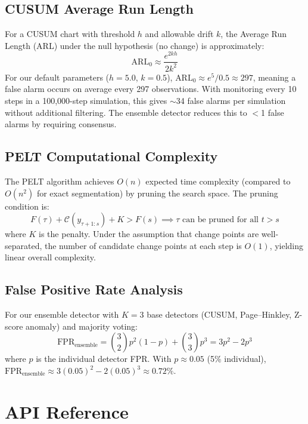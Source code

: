 \documentclass[11pt,a4paper]{article}
\begin{document}
\subsection{CUSUM Average Run Length}

For a CUSUM chart with threshold $h$ and allowable drift $k$, the Average Run Length (ARL) under the null hypothesis (no change) is approximately:
\begin{equation}
    \text{ARL}_0 \approx \frac{e^{2kh}}{2k^2}
\end{equation}
For our default parameters ($h = 5.0$, $k = 0.5$), $\text{ARL}_0 \approx e^{5}/0.5 \approx 297$, meaning a false alarm occurs on average every 297 observations. With monitoring every 10 steps in a 100{,}000-step simulation, this gives ${\sim}$34 false alarms per simulation without additional filtering. The ensemble detector reduces this to $<$1 false alarms by requiring consensus.

\subsection{PELT Computational Complexity}

The PELT algorithm achieves $O(n)$ expected time complexity (compared to $O(n^2)$ for exact segmentation) by pruning the search space. The pruning condition is:
\begin{equation}
    F(\tau) + \mathcal{C}(y_{\tau+1:s}) + K > F(s) \implies \tau \text{ can be pruned for all } t > s
\end{equation}
where $K$ is the penalty. Under the assumption that change points are well-separated, the number of candidate change points at each step is $O(1)$, yielding linear overall complexity.

\subsection{False Positive Rate Analysis}

For our ensemble detector with $K = 3$ base detectors (CUSUM, Page--Hinkley, Z-score anomaly) and majority voting:
\begin{equation}
    \text{FPR}_{\text{ensemble}} = \binom{3}{2} p^2(1-p) + \binom{3}{3} p^3 = 3p^2 - 2p^3
\end{equation}
where $p$ is the individual detector FPR. With $p \approx 0.05$ (5\% individual), $\text{FPR}_{\text{ensemble}} \approx 3(0.05)^2 - 2(0.05)^3 \approx 0.72\%$.

\section{API Reference}
\label{app:api}
\end{document}
